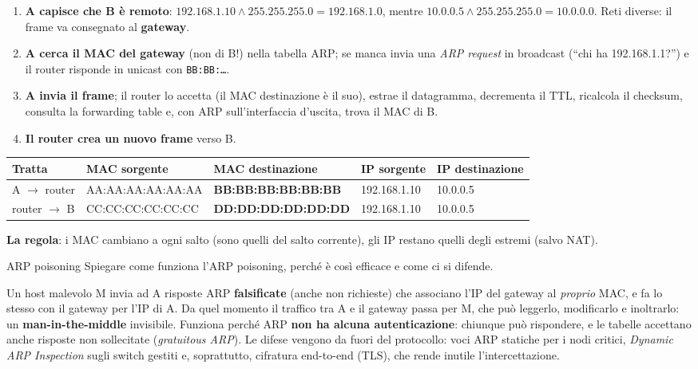 \svolgimento
\begin{enumerate}
    \item \textbf{A capisce che B è remoto}: $192.168.1.10 \wedge 255.255.255.0 = 192.168.1.0$, mentre $10.0.0.5 \wedge 255.255.255.0 = 10.0.0.0$.
          Reti diverse: il frame va consegnato al \textbf{gateway}.
    \item \textbf{A cerca il MAC del gateway} (non di B!) nella tabella ARP; se manca invia una \emph{ARP request} in broadcast
          (``chi ha 192.168.1.1?'') e il router risponde in unicast con \texttt{BB:BB:\dots}.
    \item \textbf{A invia il frame}; il router lo accetta (il MAC destinazione è il suo), estrae il datagramma, decrementa il TTL,
          ricalcola il checksum, consulta la forwarding table e, con ARP sull'interfaccia d'uscita, trova il MAC di B.
    \item \textbf{Il router crea un nuovo frame} verso B.
\end{enumerate}
\begin{center}
\small
\begin{tabular}{lllll}
\toprule
\textbf{Tratta} & \textbf{MAC sorgente} & \textbf{MAC destinazione} & \textbf{IP sorgente} & \textbf{IP destinazione} \\
\midrule
A $\rightarrow$ router & AA:AA:AA:AA:AA:AA & \textbf{BB:BB:BB:BB:BB:BB} & 192.168.1.10 & 10.0.0.5 \\
router $\rightarrow$ B & CC:CC:CC:CC:CC:CC & \textbf{DD:DD:DD:DD:DD:DD} & 192.168.1.10 & 10.0.0.5 \\
\bottomrule
\end{tabular}
\end{center}
\textbf{La regola}: i MAC cambiano a ogni salto (sono quelli del salto corrente), gli IP restano quelli degli estremi (salvo NAT).

\begin{esercizio}{ARP poisoning}
Spiegare come funziona l'ARP poisoning, perché è così efficace e come ci si difende.
\end{esercizio}

\svolgimento
Un host malevolo M invia ad A risposte ARP \textbf{falsificate} (anche non richieste) che associano l'IP del gateway al \emph{proprio}
MAC, e fa lo stesso con il gateway per l'IP di A. Da quel momento il traffico tra A e il gateway passa per M, che può leggerlo,
modificarlo e inoltrarlo: un \textbf{man-in-the-middle} invisibile. Funziona perché ARP \textbf{non ha alcuna autenticazione}: chiunque
può rispondere, e le tabelle accettano anche risposte non sollecitate (\emph{gratuitous ARP}). Le difese vengono da fuori del
protocollo: voci ARP statiche per i nodi critici, \emph{Dynamic ARP Inspection} sugli switch gestiti e, soprattutto, cifratura
end-to-end (TLS), che rende inutile l'intercettazione.

